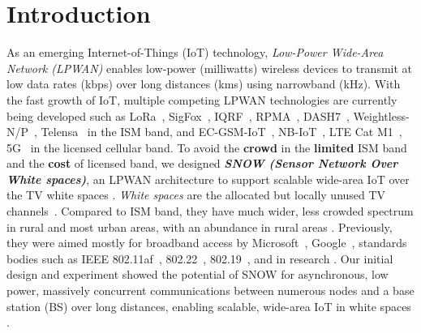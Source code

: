 

\section{Introduction}\label{sec:introduction}

As an emerging Internet-of-Things (IoT) technology, {\slshape Low-Power Wide-Area Network (LPWAN)} enables low-power (milliwatts) wireless devices to transmit at low data rates (kbps) over long distances (kms) using narrowband (kHz). With the fast growth of IoT, multiple competing LPWAN technologies are currently being developed such as LoRa~\cite{lorawan}, SigFox~\cite{sigfox}, IQRF~\cite{iqrf}, RPMA~\cite{rpma}, DASH7~\cite{dash7}, Weightless-N/P~\cite{weightless}, Telensa~\cite{telensa} in the ISM band,  and  EC-GSM-IoT~\cite{ecgsmiot}, NB-IoT~\cite{nbiot},  LTE Cat M1~\cite{cat, LTE_advancedpro},   5G~\cite{ngmn} in the licensed cellular band. To avoid the {\bf crowd} in the {\bf limited} ISM band and the {\bf cost} of licensed band, we designed {\bf\slshape  SNOW (Sensor Network Over White spaces)}, an LPWAN architecture  to support scalable wide-area IoT  over the TV white spaces \cite{ton_snow, snow, snow2}.  {\slshape White spaces} are the allocated but locally unused TV channels~\cite{FCC_first_order, fcc_second_order}. Compared to ISM band, they have much wider, less crowded spectrum in rural and most urban areas, with an abundance in rural areas 
\cite{ws_sigcomm09}.
 Previously, they were aimed mostly for broadband access by Microsoft~\cite{4Africa, MSRAfrica}, Google~\cite{GoogleAfrica}, standards bodies such as IEEE 802.11af~\cite{IEE802_af},   802.22~\cite{IEEE802_22},   802.19~\cite{IEE802_19}, and in research  
\cite{saeed2017local, ws_dyspan08_kim, ws_mobicom08, ws_dyspan11, FIWEX, dbreq, database1, database2, database3, vehiclebased, hysim, zhang2015design, hasan2014gsm, kumar, harrison2015whitespace, ws_sigcomm09, WATCH, videostreaming, linkasymmetry, ws_mobicom13, ws_nsdi10}. 
Our initial design and experiment showed the potential of SNOW for asynchronous, low power,   massively concurrent communications between numerous nodes and a base station (BS) over long distances, enabling scalable, wide-area IoT in white spaces \cite{ton_snow, snow, snow2}. 




